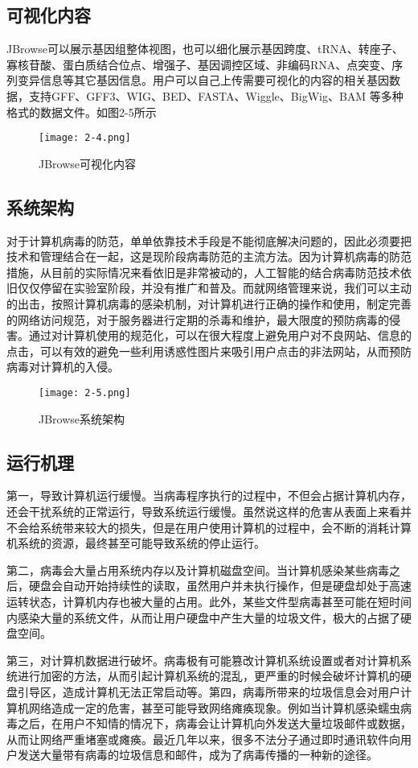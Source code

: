 		\subsection{可视化内容}
			JBrowse可以展示基因组整体视图，也可以细化展示基因跨度、tRNA、转座子、寡核苷酸、蛋白质结合位点、增强子、基因调控区域、非编码RNA、点突变、序列变异信息等其它基因信息。用户可以自己上传需要可视化的内容的相关基因数据，支持GFF、GFF3、WIG、BED、FASTA、Wiggle、BigWig、BAM 等多种格式的数据文件。如图2-5所示
		\begin{figure}[!ht]
			\centering
			\texttt{[image: 2-4.png]}
			\caption{JBrowse可视化内容}
		\end{figure}
		\subsection{系统架构}
			对于计算机病毒的防范，单单依靠技术手段是不能彻底解决问题的，因此必须要把技术和管理结合在一起，这是现阶段病毒防范的主流方法。因为计算机病毒的防范措施，从目前的实际情况来看依旧是非常被动的，人工智能的结合病毒防范技术依旧仅仅停留在实验室阶段，并没有推广和普及。而就网络管理来说，我们可以主动的出击，按照计算机病毒的感染机制，对计算机进行正确的操作和使用，制定完善的网络访问规范，对于服务器进行定期的杀毒和维护，最大限度的预防病毒的侵害。通过对计算机使用的规范化，可以在很大程度上避免用户对不良网站、信息的点击，可以有效的避免一些利用诱惑性图片来吸引用户点击的非法网站，从而预防病毒对计算机的入侵。
		\begin{figure}[!ht]
			\centering
			\texttt{[image: 2-5.png]}
			\caption{JBrowse系统架构}
		\end{figure}
		\subsection{运行机理}
		第一，导致计算机运行缓慢。当病毒程序执行的过程中，不但会占据计算机内存，还会干扰系统的正常运行，导致系统运行缓慢。虽然说这样的危害从表面上来看并不会给系统带来较大的损失，但是在用户使用计算机的过程中，会不断的消耗计算机系统的资源，最终甚至可能导致系统的停止运行。

		第二，病毒会大量占用系统内存以及计算机磁盘空间。当计算机感染某些病毒之后，硬盘会自动开始持续性的读取，虽然用户并未执行操作，但是硬盘却处于高速运转状态，计算机内存也被大量的占用。此外，某些文件型病毒甚至可能在短时间内感染大量的系统文件，从而让用户硬盘中产生大量的垃圾文件，极大的占据了硬盘空间。

		第三，对计算机数据进行破坏。病毒极有可能篡改计算机系统设置或者对计算机系统进行加密的方法，从而引起计算机系统的混乱，更严重的时候会破坏计算机的硬盘引导区，造成计算机无法正常启动等。第四，病毒所带来的垃圾信息会对用户计算机网络造成一定的危害，甚至可能导致网络瘫痪现象。例如当计算机感染蠕虫病毒之后，在用户不知情的情况下，病毒会让计算机向外发送大量垃圾邮件或数据，从而让网络严重堵塞或瘫痪。最近几年以来，很多不法分子通过即时通讯软件向用户发送大量带有病毒的垃圾信息和邮件，成为了病毒传播的一种新的途径。

